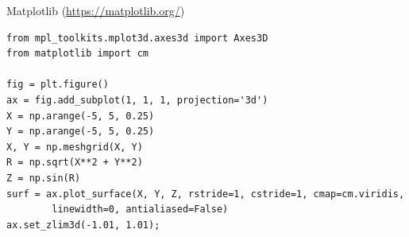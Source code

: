 \documentclass{beamer}
\begin{document}
\begin{frame}[fragile]{Matplotlib (\url{https://matplotlib.org/})}
\begin{lstlisting}
from mpl_toolkits.mplot3d.axes3d import Axes3D
from matplotlib import cm

fig = plt.figure()
ax = fig.add_subplot(1, 1, 1, projection='3d')
X = np.arange(-5, 5, 0.25)
Y = np.arange(-5, 5, 0.25)
X, Y = np.meshgrid(X, Y)
R = np.sqrt(X**2 + Y**2)
Z = np.sin(R)
surf = ax.plot_surface(X, Y, Z, rstride=1, cstride=1, cmap=cm.viridis,
        linewidth=0, antialiased=False)
ax.set_zlim3d(-1.01, 1.01);
\end{lstlisting}
\end{frame}








\end{document}
